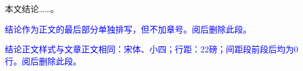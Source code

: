 %
%
%
%
%
%

\begin{conclusion}

  本文结论……\cite{张伯伟2002全唐五代诗格会考}。

  \textcolor{blue}{结论作为正文的最后部分单独排写，但不加章号。阅后删除此段。}

  \textcolor{blue}{结论正文样式与文章正文相同：宋体、小四；行距：22磅；间距段前段后均为0行。阅后删除此段。}
\end{conclusion}
